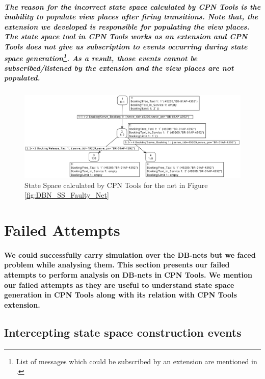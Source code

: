 \subparagraph*{\textnormal{The reason for the incorrect state space calculated by CPN Tools is the inability to populate view places after firing transitions. Note that, the extension we developed is responsible for populating the view places. The state space tool in CPN Tools works as an extension and CPN Tools does not give us subscription to events occurring during state space generation\footnote{List of messages which could be subscribed by an extension are mentioned in \cite{CPN_Tools_Message_Format}.}. As a result, those events cannot be subscribed/listened by the extension and the view places are not populated.}}
\begin{figure}[!htbp]
	\centering
	\includegraphics[scale = 0.40]{DBN_SS_Faulty_Net_State_Space.pdf}
	\caption{State Space calculated by CPN Tools for the net in Figure \ref{fig:DBN_SS_Faulty_Net}}
	\label{fig:DBN_SS_Faulty_Net_State_Space}
\end{figure}

\section{Failed Attempts}
\label{sec:DBN_SS_Failed_Attempts}
\paragraph*{\textnormal{We could successfully carry simulation over the DB-nets but we faced problem while analysing them. This section presents our failed attempts to perform analysis on DB-nets in CPN Tools. We mention our failed attempts as they are useful to understand state space generation in CPN Tools along with its relation with CPN Tools extension.}}

\subsection*{Intercepting state space construction events}
